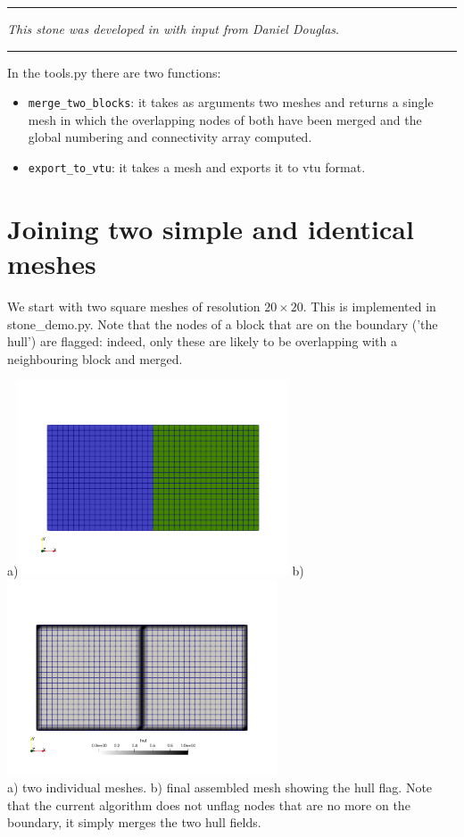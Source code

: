 \par\noindent\rule{\textwidth}{0.4pt}

{\sl This stone was developed in with input from Daniel Douglas}. 

\par\noindent\rule{\textwidth}{0.4pt}


In the {\pythonfile tools.py} there are two functions:
\begin{itemize}
\item \verb'merge_two_blocks': it takes as arguments two meshes and returns a single mesh in which 
the overlapping nodes of both have been merged and the global numbering and connectivity array computed.
\item \verb'export_to_vtu': it takes a mesh and exports it to vtu format.
\end{itemize}

\section*{Joining two simple and identical meshes}

We start with two square meshes of resolution $20 \times 20$. This is implemented 
in {\pythonfile stone\_demo.py}. Note that the nodes of a block that are on the boundary 
('the hull') are flagged: indeed, only these are likely to be overlapping with a neighbouring 
block and merged.

\begin{center}
a)\includegraphics[width=8cm]{python_codes/fieldstone_149/results/meshing/one}
b)\includegraphics[width=8cm]{python_codes/fieldstone_149/results/meshing/two}\\
{\captionfont a) two individual meshes. b) final assembled mesh showing the hull flag. Note that the current algorithm does 
not unflag nodes that are no more on the boundary, it simply merges the two hull fields.}
\end{center}


